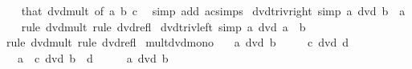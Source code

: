 \begin{isabellebody}
%
\isadelimproof
\ \ %
\endisadelimproof
%
\isatagproof
{}\isamarkupfalse%
\ that\ dvd{\isacharunderscore}{\kern0pt}mult\ {\isacharbrackleft}{\kern0pt}of\ a\ b\ c{\isacharbrackright}{\kern0pt}\ \isamarkupfalse%
\ {\isacharparenleft}{\kern0pt}simp\ add{\isacharcolon}{\kern0pt}\ ac{\isacharunderscore}{\kern0pt}simps{\isacharparenright}{\kern0pt}%
\endisatagproof
{\isafoldproof}%
%
\isadelimproof
\isanewline
%
\endisadelimproof
\isanewline
{}\isamarkupfalse%
\ dvd{\isacharunderscore}{\kern0pt}triv{\isacharunderscore}{\kern0pt}right\ {\isacharbrackleft}{\kern0pt}simp{\isacharbrackright}{\kern0pt}{\isacharcolon}{\kern0pt}\ {\isachardoublequoteopen}a\ dvd\ b\ {\isacharasterisk}{\kern0pt}\ a{\isachardoublequoteclose}\isanewline
%
\isadelimproof
\ \ %
\endisadelimproof
%
\isatagproof
{}\isamarkupfalse%
\ {\isacharparenleft}{\kern0pt}rule\ dvd{\isacharunderscore}{\kern0pt}mult{\isacharparenright}{\kern0pt}\ {\isacharparenleft}{\kern0pt}rule\ dvd{\isacharunderscore}{\kern0pt}refl{\isacharparenright}{\kern0pt}%
\endisatagproof
{\isafoldproof}%
%
\isadelimproof
\isanewline
%
\endisadelimproof
\isanewline
{}\isamarkupfalse%
\ dvd{\isacharunderscore}{\kern0pt}triv{\isacharunderscore}{\kern0pt}left\ {\isacharbrackleft}{\kern0pt}simp{\isacharbrackright}{\kern0pt}{\isacharcolon}{\kern0pt}\ {\isachardoublequoteopen}a\ dvd\ a\ {\isacharasterisk}{\kern0pt}\ b{\isachardoublequoteclose}\isanewline
%
\isadelimproof
\ \ %
\endisadelimproof
%
\isatagproof
{}\isamarkupfalse%
\ {\isacharparenleft}{\kern0pt}rule\ dvd{\isacharunderscore}{\kern0pt}mult{}{\isacharparenright}{\kern0pt}\ {\isacharparenleft}{\kern0pt}rule\ dvd{\isacharunderscore}{\kern0pt}refl{\isacharparenright}{\kern0pt}%
\endisatagproof
{\isafoldproof}%
%
\isadelimproof
\isanewline
%
\endisadelimproof
\isanewline
{}\isamarkupfalse%
\ mult{\isacharunderscore}{\kern0pt}dvd{\isacharunderscore}{\kern0pt}mono{\isacharcolon}{\kern0pt}\isanewline
\ \ \ {\isachardoublequoteopen}a\ dvd\ b{\isachardoublequoteclose}\isanewline
\ \ \ \ \ {\isachardoublequoteopen}c\ dvd\ d{\isachardoublequoteclose}\isanewline
\ \ \ {\isachardoublequoteopen}a\ {\isacharasterisk}{\kern0pt}\ c\ dvd\ b\ {\isacharasterisk}{\kern0pt}\ d{\isachardoublequoteclose}\isanewline
%
\isadelimproof
%
\endisadelimproof
%
\isatagproof
{}\isamarkupfalse%
\ {\isacharminus}{\kern0pt}\isanewline
\ \ \isamarkupfalse%
\ {\isacartoucheopen}a\ dvd\ b{\isacartoucheclose}\ \isamarkupfalse%

\end{isabellebody}
